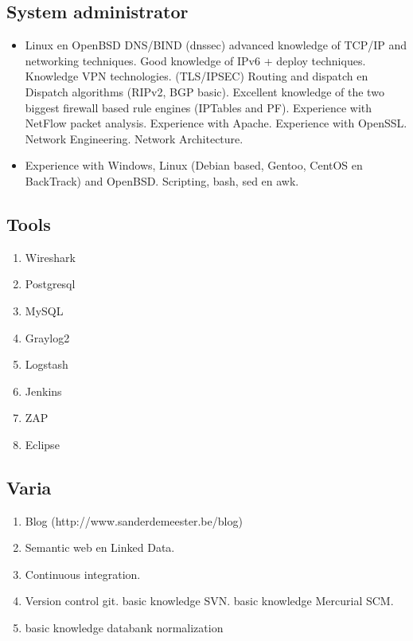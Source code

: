 \documentclass[margin, 10pt]{res} %
\begin{document}
\subsection{System administrator}
\begin{itemize}
\item Linux en OpenBSD
\subitem DNS/BIND (dnssec)
\subitem advanced knowledge of TCP/IP and networking techniques.
\subitem Good knowledge of IPv6 + deploy techniques.
\subitem Knowledge VPN technologies. (TLS/IPSEC)
\subitem Routing and dispatch en Dispatch algorithms (RIPv2, BGP basic).
\subitem Excellent knowledge of the two biggest firewall based rule engines (IPTables and PF).
\subitem Experience with NetFlow packet analysis.
\subitem Experience with Apache.
\subitem Experience with OpenSSL.
\subitem Network Engineering.
\subitem Network Architecture.
\item Experience with Windows, Linux (Debian based, Gentoo, CentOS en BackTrack) and OpenBSD.
\subitem Scripting, bash, sed en awk.
\end{itemize}
\begin{multicols}{2}
\subsection*{Tools}
\begin{enumerate}
\item[] Wireshark
\item[] Postgresql
\item[] MySQL
\item[] Graylog2
\item[] Logstash
\item[] Jenkins
\item[] ZAP
\item[] Eclipse
\end{enumerate}
\subsection{Varia}
\begin{enumerate}
\item[] Blog (http://www.sanderdemeester.be/blog)
\item[] Semantic web en Linked Data.
\item[] Continuous integration.
\item[] Version control
\subitem git.
\subitem basic knowledge SVN.
\subitem basic knowledge Mercurial SCM.
\item[] basic knowledge databank normalization
\end{enumerate}
\end{multicols}
\end{document}
